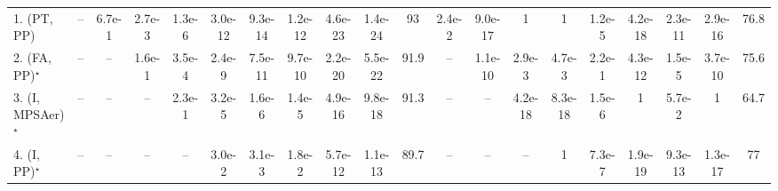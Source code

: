 \begin{table}[ht]
{\begin{tabular}{l|cccccccccc|ccccccccc|}
1. (PT, PP) & -- & 6.7e-1 & {\cellcolor[HTML]{309950}} \color[HTML]{F1F1F1} 2.7e-3 & {\cellcolor[HTML]{00441B}} \color[HTML]{F1F1F1} 1.3e-6 & {\cellcolor[HTML]{00441B}} \color[HTML]{F1F1F1} 3.0e-12 & {\cellcolor[HTML]{00441B}} \color[HTML]{F1F1F1} 9.3e-14 & {\cellcolor[HTML]{00441B}} \color[HTML]{F1F1F1} 1.2e-12 & {\cellcolor[HTML]{00441B}} \color[HTML]{F1F1F1} 4.6e-23 & {\cellcolor[HTML]{00441B}} \color[HTML]{F1F1F1} 1.4e-24 & 93 & {\cellcolor[HTML]{B5E1AE}} \color[HTML]{000000} 2.4e-2 & {\cellcolor[HTML]{00441B}} \color[HTML]{F1F1F1} 9.0e-17 & 1 & 1 & {\cellcolor[HTML]{00441B}} \color[HTML]{F1F1F1} 1.2e-5 & {\cellcolor[HTML]{00441B}} \color[HTML]{F1F1F1} 4.2e-18 & {\cellcolor[HTML]{00441B}} \color[HTML]{F1F1F1} 2.3e-11 & {\cellcolor[HTML]{00441B}} \color[HTML]{F1F1F1} 2.9e-16 & 76.8 \\
2. (FA, PP)$^\star$ & -- & -- & 1.6e-1 & {\cellcolor[HTML]{00441B}} \color[HTML]{F1F1F1} 3.5e-4 & {\cellcolor[HTML]{00441B}} \color[HTML]{F1F1F1} 2.4e-9 & {\cellcolor[HTML]{00441B}} \color[HTML]{F1F1F1} 7.5e-11 & {\cellcolor[HTML]{00441B}} \color[HTML]{F1F1F1} 9.7e-10 & {\cellcolor[HTML]{00441B}} \color[HTML]{F1F1F1} 2.2e-20 & {\cellcolor[HTML]{00441B}} \color[HTML]{F1F1F1} 5.5e-22 & 91.9 & -- & {\cellcolor[HTML]{00441B}} \color[HTML]{F1F1F1} 1.1e-10 & {\cellcolor[HTML]{309950}} \color[HTML]{F1F1F1} 2.9e-3 & {\cellcolor[HTML]{309950}} \color[HTML]{F1F1F1} 4.7e-3 & 2.2e-1 & {\cellcolor[HTML]{00441B}} \color[HTML]{F1F1F1} 4.3e-12 & {\cellcolor[HTML]{00441B}} \color[HTML]{F1F1F1} 1.5e-5 & {\cellcolor[HTML]{00441B}} \color[HTML]{F1F1F1} 3.7e-10 & 75.6 \\
3. (I, MPSAer)$^\star$ & -- & -- & -- & 2.3e-1 & {\cellcolor[HTML]{00441B}} \color[HTML]{F1F1F1} 3.2e-5 & {\cellcolor[HTML]{00441B}} \color[HTML]{F1F1F1} 1.6e-6 & {\cellcolor[HTML]{00441B}} \color[HTML]{F1F1F1} 1.4e-5 & {\cellcolor[HTML]{00441B}} \color[HTML]{F1F1F1} 4.9e-16 & {\cellcolor[HTML]{00441B}} \color[HTML]{F1F1F1} 9.8e-18 & 91.3 & -- & -- & {\cellcolor[HTML]{00441B}} \color[HTML]{F1F1F1} 4.2e-18 & {\cellcolor[HTML]{00441B}} \color[HTML]{F1F1F1} 8.3e-18 & {\cellcolor[HTML]{00441B}} \color[HTML]{F1F1F1} 1.5e-6 & 1 & 5.7e-2 & 1 & 64.7 \\
4. (I, PP)$^\star$ & -- & -- & -- & -- & {\cellcolor[HTML]{B5E1AE}} \color[HTML]{000000} 3.0e-2 & {\cellcolor[HTML]{309950}} \color[HTML]{F1F1F1} 3.1e-3 & {\cellcolor[HTML]{B5E1AE}} \color[HTML]{000000} 1.8e-2 & {\cellcolor[HTML]{00441B}} \color[HTML]{F1F1F1} 5.7e-12 & {\cellcolor[HTML]{00441B}} \color[HTML]{F1F1F1} 1.1e-13 & 89.7 & -- & -- & -- & 1 & {\cellcolor[HTML]{00441B}} \color[HTML]{F1F1F1} 7.3e-7 & {\cellcolor[HTML]{00441B}} \color[HTML]{F1F1F1} 1.9e-19 & {\cellcolor[HTML]{00441B}} \color[HTML]{F1F1F1} 9.3e-13 & {\cellcolor[HTML]{00441B}} \color[HTML]{F1F1F1} 1.3e-17 & 77 \\

\end{tabular}}
\end{table}
